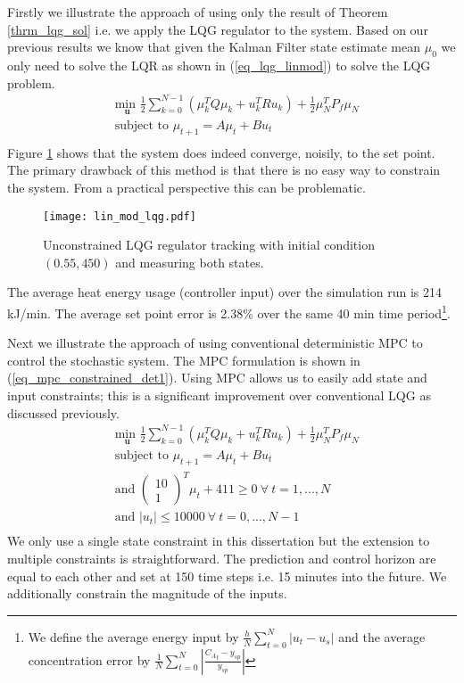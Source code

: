 Firstly we illustrate the approach of using only the result of Theorem \ref{thrm_lqg_sol} i.e. we apply the LQG regulator to the system. Based on our previous results we know that given the Kalman Filter state estimate mean $\mu_0$ we only need to solve the LQR as shown in (\ref{eq_lqg_linmod}) to solve the LQG problem. 
\begin{equation}
\begin{aligned}
&\underset{\mathbf{u}}{\text{min }} \frac{1}{2}\sum_{k=0}^{N-1} \left( \mu_k^TQ\mu_k + u_k^TRu_k \right) + \frac{1}{2}\mu_N^TP_f\mu_N \\
& \text{subject to } \mu_{t+1}=A\mu_t + Bu_t \\
\end{aligned}
\label{eq_lqg_linmod}
\end{equation}
Figure \ref{fig_lin_mod_lqg} shows that the system does indeed converge, noisily, to the set point. The primary drawback of this method is that there is no easy way to constrain the system. From a practical perspective this can be problematic. 
\begin{figure}[H] 
\centering
\texttt{[image: lin\_mod\_lqg.pdf]}
\caption{Unconstrained LQG regulator tracking with initial condition $(0.55, 450)$ and measuring both states.}
\label{fig_lin_mod_lqg}
\end{figure}
The average heat energy usage (controller input) over the simulation run is 214 kJ/min. The average set point error is 2.38\% over the same 40 min time period\footnote{We define the average energy input by $\frac{h}{N}\sum^N_{t=0}|u_t-u_s|$ and the average concentration error by $\frac{1}{N}\sum^N_{t=0}|\frac{{C_A}_t-y_{sp}}{y_{sp}}|$}.
 
Next we illustrate the approach of using conventional deterministic MPC to control the stochastic system. The MPC formulation is shown in (\ref{eq_mpc_constrained_det1}). Using MPC allows us to easily add state and input constraints; this is a significant improvement over conventional LQG as discussed previously.
\begin{equation}
\begin{aligned}
&\underset{\mathbf{u}}{\text{min }} \frac{1}{2}\sum_{k=0}^{N-1} \left( \mu_k^TQ\mu_k + u_k^TRu_k \right) + \frac{1}{2}\mu_N^TP_f\mu_N \\
& \text{subject to } \mu_{t+1}=A\mu_t + Bu_t \\
&\text{and } \begin{pmatrix}
10 \\ 1
\end{pmatrix}^T \mu_t + 411 \geq 0 ~\forall ~t=1,...,N\\
& \text{and } |u_t| \leq 10000 ~\forall ~t=0,...,N-1\\
\end{aligned}
\label{eq_mpc_constrained_det1}
\end{equation}
We only use a single state constraint in this dissertation but the extension to multiple constraints is straightforward. The prediction and control horizon are equal to each other and set at 150 time steps i.e. 15 minutes into the future. We additionally constrain the magnitude of the inputs.

